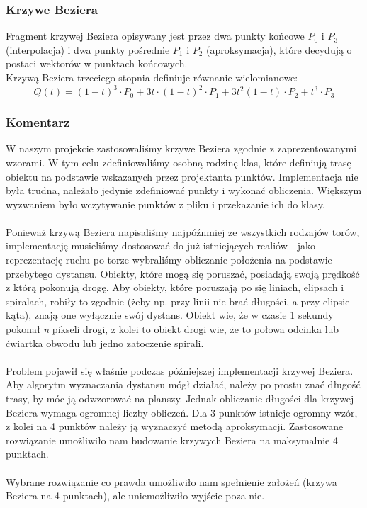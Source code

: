	\subsubsection{Krzywe Beziera}
		\indent \indent Fragment krzywej Beziera opisywany jest przez dwa punkty końcowe $ P_0 $ i $ P_3 $ (interpolacja) i dwa punkty pośrednie $ P_1 $ i $ P_2 $ (aproksymacja), które decydują o postaci wektorów w punktach końcowych.\\Krzywą Beziera trzeciego stopnia definiuje równanie wielomianowe:
		$$ Q(t)=(1-t)^3\cdot P_0+3t\cdot(1-t)^2\cdot P_1+3t^2(1-t)\cdot P_2+t^3\cdot P_3 $$
		
	\subsubsection{{\large Komentarz}}
		\indent \indent W naszym projekcie zastosowaliśmy krzywe Beziera zgodnie z zaprezentowanymi wzorami. W tym celu zdefiniowaliśmy osobną rodzinę klas, które definiują trasę obiektu na podstawie wskazanych przez projektanta punktów. Implementacja nie była trudna, należało jedynie zdefiniować punkty i wykonać obliczenia. Większym wyzwaniem było wczytywanie punktów z pliku i przekazanie ich do klasy.\\\\
		\indent Ponieważ krzywą Beziera napisaliśmy najpóźnmiej ze wszystkich rodzajów torów, implementację musieliśmy dostosować do już istniejących realiów - jako reprezentację ruchu po torze wybraliśmy obliczanie położenia na podstawie przebytego dystansu. Obiekty, które mogą się poruszać, posiadają swoją prędkość z którą pokonują drogę. Aby obiekty, które poruszają po się liniach, elipsach i spiralach, robiły to zgodnie (żeby np. przy linii nie brać długości, a przy elipsie kąta), znają one wyłącznie swój dystans. Obiekt wie, że w czasie 1 sekundy pokonał \emph{n} pikseli drogi, z kolei to obiekt drogi wie, że to połowa odcinka lub ćwiartka obwodu lub jedno zatoczenie spirali.\\\\
		\indent Problem pojawił się właśnie podczas późniejszej implementacji krzywej Beziera. Aby algorytm wyznaczania dystansu mógł działać, należy po prostu znać długość trasy, by móc ją odwzorować na planszy. Jednak obliczanie długości dla krzywej Beziera wymaga ogromnej liczby obliczeń. Dla 3 punktów istnieje ogromny wzór, z kolei na 4 punktów należy ją wyznaczyć metodą aproksymacji. Zastosowane rozwiązanie umożliwiło nam budowanie krzywych Beziera na maksymalnie 4 punktach.\\\\
		\indent Wybrane rozwiązanie co prawda umożliwiło nam spełnienie założeń (krzywa Beziera na 4 punktach), ale uniemożliwiło wyjście poza nie.
		

